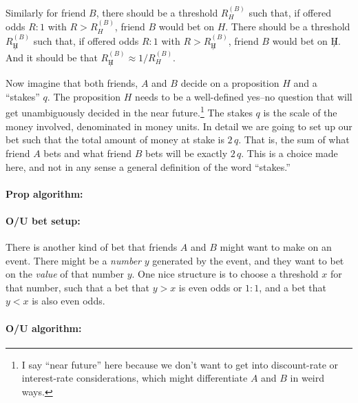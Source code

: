 \documentclass{article}
\begin{document}
Similarly for friend $B$, there should be a threshold $R_H^{(B)}$ such that, if offered odds $R:1$ with $R>R_H^{(B)}$, friend $B$ would bet on $H$.
There should be a threshold $R_{\not H}^{(B)}$ such that, if offered odds $R:1$ with $R>R_{\not H}^{(B)}$, friend $B$
would bet on $\not H$.
And it should be that $R_{\not H}^{(B)} \approx 1/R_H^{(B)}$.

Now imagine that both friends, $A$ and $B$ decide on a proposition $H$ and a ``stakes'' $q$.
The proposition $H$ needs to be a well-defined yes--no question that will get unambiguously decided in the near future.\footnote{%
I say ``near future'' here because we don't want to get into discount-rate or interest-rate considerations,
which might differentiate $A$ and $B$ in weird ways.}
The stakes $q$ is the scale of the money involved, denominated in money units.
In detail we are going to set up our bet such that the total amount of money at stake is $2\,q$.
That is, the sum of what friend $A$ bets and what friend $B$ bets will be exactly $2\,q$.
This is a choice made here, and not in any sense a general definition of the word ``stakes.''

\paragraph{Prop algorithm:}

\paragraph{O/U bet setup:}
There is another kind of bet that friends $A$ and $B$ might want to make on an event.
There might be a \emph{number} $y$ generated by the event, and they want to bet on the \emph{value} of that number $y$.
One nice structure is to choose a threshold $x$ for that number, such that a bet that $y>x$ is even odds or $1:1$, and
a bet that $y<x$ is also even odds.

\paragraph{O/U algorithm:}
\end{document}
